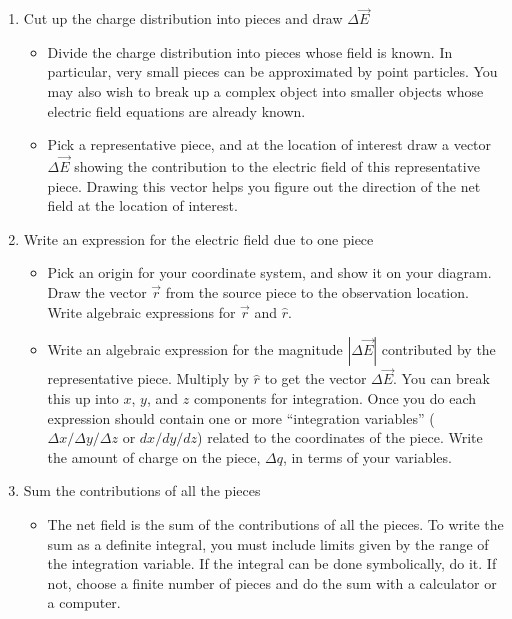 \documentclass[nobib]{tufte-handout}
\begin{document}
\begin{enumerate}
    \item Cut up the charge distribution into pieces and draw $\Delta \vec{E}$
    \begin{itemize}
        \item Divide the charge distribution into pieces whose field is known. 
        In particular, very small pieces can be approximated by point particles.
        You may also wish to break up a complex object into smaller objects whose
        electric field equations are already known. 
        \item Pick a representative piece, and at the location of interest draw a 
        vector $\Delta \vec{E}$ showing the contribution to the electric field of this representative piece. 
        Drawing this vector helps you figure out the direction of the net field at the location of interest.
    \end{itemize}
    \item Write an expression for the electric field due to one piece
    \begin{itemize}
        \item Pick an origin for your coordinate system, and show it on your diagram.
        Draw the vector $\vec{r}$ from the source piece to the observation location. 
        Write algebraic expressions for $\vec{r}$ and $\hat{r}$.
        \item Write an algebraic expression for the magnitude $|\Delta \vec{E}|$ contributed by the representative piece. Multiply by
        $\hat{r}$ to get the vector $\Delta \vec{E}$. You can break this up into 
        $x$, $y$, and $z$ components for integration. Once you do each expression should 
        contain one or more “integration variables” ($\Delta x/\Delta y/ \Delta z$ or $dx/dy/dz$) related to the coordinates of the piece.
        Write the amount of charge on the piece, $\Delta q$, in terms of your variables. 
    \end{itemize}
    \item Sum the contributions of all the pieces
    \begin{itemize}
        \item The net field is the sum of the contributions of all the pieces. 
        To write the sum as a definite integral, you must include limits 
        given by the range of the integration variable. If the integral 
        can be done symbolically, do it. If not, choose a finite number 
        of pieces and do the sum with a calculator or a computer.

\end{itemize}
\end{enumerate}
\end{document}
